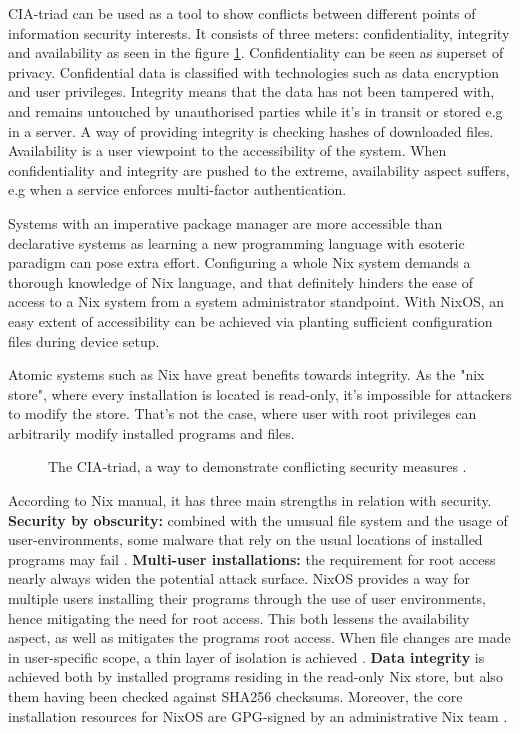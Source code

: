 CIA-triad can be used as a tool to show conflicts between different
points of information security interests. It consists of three meters:
confidentiality, integrity and availability as seen in the figure
\ref{ciatriad}. Confidentiality can be seen as superset of
privacy. Confidential data is classified with technologies such as
data encryption and user privileges. Integrity means that the data has
not been tampered with, and remains untouched by unauthorised parties
while it's in transit or stored e.g in a server. A way of providing
integrity is checking hashes of downloaded files. Availability is a
user viewpoint to the accessibility of the system. When
confidentiality and integrity are pushed to the extreme, availability
aspect suffers, e.g when a service enforces multi-factor
authentication. \cite{pender2019parkerian}

Systems with an imperative package manager are more accessible than
declarative systems as learning a new programming language with
esoteric paradigm can pose extra effort. Configuring a whole Nix
system demands a thorough knowledge of Nix language, and that
definitely hinders the ease of access to a Nix system from a system
administrator standpoint. With NixOS, an easy extent of accessibility
can be achieved via planting sufficient configuration files during
device setup.

Atomic systems such as Nix have great benefits towards integrity. As
the "nix store", where every installation is located is read-only,
it's impossible for attackers to modify the store. That's not the
case, where user with root privileges can arbitrarily modify installed
programs and files.

\begin{figure}[t!]
\centerline{}
\caption{The CIA-triad, a way to demonstrate conflicting security
  measures \cite{hughes2013quantitative}.}
\label{ciatriad}
\end{figure}

According to Nix manual, it has three main strengths in relation with
security. \textbf{Security by obscurity: }combined with the unusual
file system and the usage of user-environments, some malware that rely
on the usual locations of installed programs may fail
\cite{nixosSecurityNixOS}. \textbf{Multi-user installations: }the
requirement for root access nearly always widen the potential attack
surface. NixOS provides a way for multiple users installing their
programs through the use of user environments, hence mitigating the
need for root access. This both lessens the availability aspect, as
well as mitigates the programs root access. When file changes are made
in user-specific scope, a thin layer of isolation is
achieved \cite{nixosNixOSManual}. \textbf{Data integrity} is achieved
both by installed programs residing in the read-only Nix store, but
also them having been checked against SHA256 checksums. Moreover, the
core installation resources for NixOS are GPG-signed by an
administrative Nix team \cite{nixosSecurityNixOS}.
